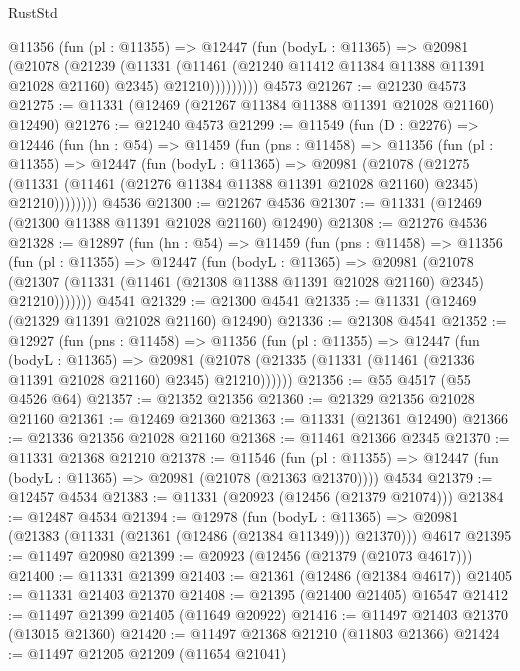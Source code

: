 \begin{lexlean}{RustStd}
\begin{coremodule}
          @11356
            (fun (pl : @11355) =>
            @12447
              (fun (bodyL : @11365) =>
              @20981
                (@21078
                  (@21239
                    (@11331
                      (@11461 (@21240 @11412 @11384 @11388 @11391 @21028 @21160) @2345)
                      @21210)))))))))
    @4573
@21267 := @21230 @4573
@21275 := @11331 (@12469 (@21267 @11384 @11388 @11391 @21028 @21160) @12490)
@21276 := @21240 @4573
@21299 := @11549
    (fun (D : @2276) =>
    @12446
      (fun (hn : @54) =>
      @11459
        (fun (pns : @11458) =>
        @11356
          (fun (pl : @11355) =>
          @12447
            (fun (bodyL : @11365) =>
            @20981
              (@21078
                (@21275
                  (@11331 (@11461 (@21276 @11384 @11388 @11391 @21028 @21160) @2345) @21210))))))))
    @4536
@21300 := @21267 @4536
@21307 := @11331 (@12469 (@21300 @11388 @11391 @21028 @21160) @12490)
@21308 := @21276 @4536
@21328 := @12897
    (fun (hn : @54) =>
    @11459
      (fun (pns : @11458) =>
      @11356
        (fun (pl : @11355) =>
        @12447
          (fun (bodyL : @11365) =>
          @20981
            (@21078
              (@21307 (@11331 (@11461 (@21308 @11388 @11391 @21028 @21160) @2345) @21210)))))))
    @4541
@21329 := @21300 @4541
@21335 := @11331 (@12469 (@21329 @11391 @21028 @21160) @12490)
@21336 := @21308 @4541
@21352 := @12927
    (fun (pns : @11458) =>
    @11356
      (fun (pl : @11355) =>
      @12447
        (fun (bodyL : @11365) =>
        @20981 (@21078 (@21335 (@11331 (@11461 (@21336 @11391 @21028 @21160) @2345) @21210))))))
@21356 := @55 @4517 (@55 @4526 @64)
@21357 := @21352 @21356
@21360 := @21329 @21356 @21028 @21160
@21361 := @12469 @21360
@21363 := @11331 (@21361 @12490)
@21366 := @21336 @21356 @21028 @21160
@21368 := @11461 @21366 @2345
@21370 := @11331 @21368 @21210
@21378 := @11546
    (fun (pl : @11355) => @12447 (fun (bodyL : @11365) => @20981 (@21078 (@21363 @21370))))
    @4534
@21379 := @12457 @4534
@21383 := @11331 (@20923 (@12456 (@21379 @21074)))
@21384 := @12487 @4534
@21394 := @12978
    (fun (bodyL : @11365) => @20981 (@21383 (@11331 (@21361 (@12486 (@21384 @11349))) @21370)))
    @4617
@21395 := @11497 @20980
@21399 := @20923 (@12456 (@21379 (@21073 @4617)))
@21400 := @11331 @21399
@21403 := @21361 (@12486 (@21384 @4617))
@21405 := @11331 @21403 @21370
@21408 := @21395 (@21400 @21405) @16547
@21412 := @11497 @21399 @21405 (@11649 @20922)
@21416 := @11497 @21403 @21370 (@13015 @21360)
@21420 := @11497 @21368 @21210 (@11803 @21366)
@21424 := @11497 @21205 @21209 (@11654 @21041)

\end{coremodule}
\end{lexlean}
